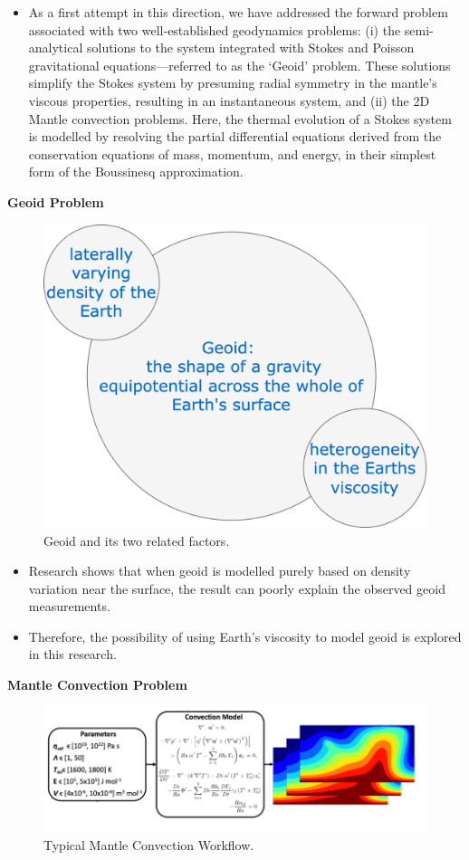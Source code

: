 {\begin{itemize}
    \item As a first attempt in this direction, we have addressed the forward problem associated with two well-established geodynamics problems: (i) the semi-analytical solutions to the system integrated with Stokes and Poisson gravitational equations—referred to as the `Geoid' problem. These solutions simplify the Stokes system by presuming radial symmetry in the mantle's viscous properties, resulting in an instantaneous system, and (ii) the 2D Mantle convection problems. Here, the thermal evolution of a Stokes system is modelled by resolving the partial differential equations derived from the conservation equations of mass, momentum, and energy, in their simplest form of the Boussinesq approximation.
\end{itemize}



\textbf{Geoid Problem}

\begin{figure}[H]
    \centering
    \includegraphics[width=0.4\linewidth]{figures/Geoid.png}
    \caption{Geoid and its two related factors.}
\end{figure}

\begin{itemize}
     \item Research shows that when geoid is modelled purely based on density variation near the surface, the result can poorly explain the observed geoid measurements.

     \item Therefore, the possibility of using Earth's viscosity to model geoid is explored in this research.
\end{itemize}

\textbf{Mantle Convection Problem}

\begin{figure}[H]
    \includegraphics[width=\linewidth]{figures/Mantle_Convection_workflow.png}
    \caption{Typical Mantle Convection Workflow.}
\end{figure}

}
